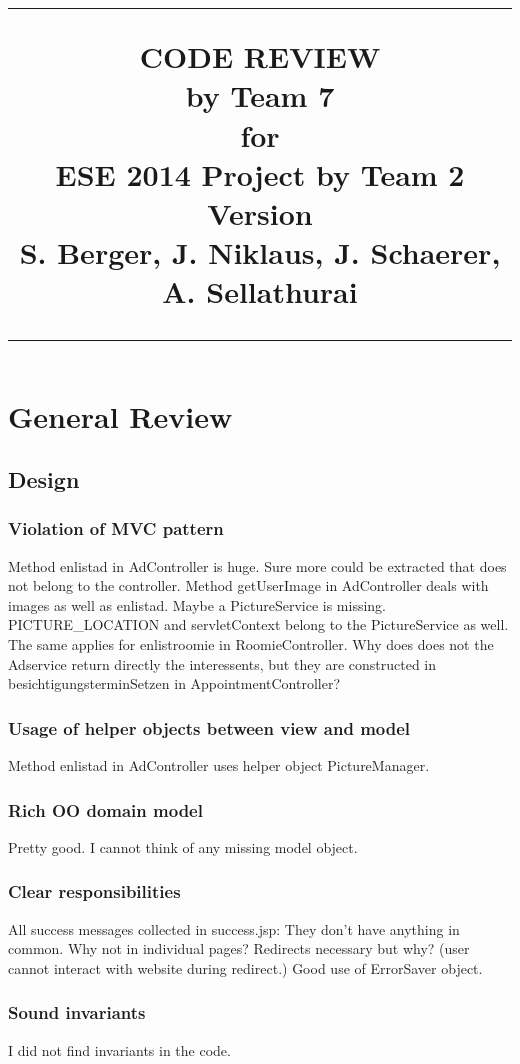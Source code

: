\documentclass{scrreprt}
\title{%
\flushright
\rule{16cm}{5pt}\vskip1cm
\Huge{CODE REVIEW\\ by Team 7}\\
\vspace{2cm}
for\\
\vspace{2cm}
ESE 2014 Project by Team 2\\
\vspace{2cm}
\LARGE{Version \myversion \\}
\vspace{2cm}
S. Berger, J. Niklaus, J. Schaerer, A. Sellathurai \\
\vfill
\rule{16cm}{5pt}
}
\date{}
\begin{document}
\maketitle
\tableofcontents

\chapter{General Review}
\section{Design}
\subsection{Violation of MVC pattern}
Method enlistad in AdController is huge. Sure more could be extracted that does not belong to the controller. Method getUserImage in AdController deals with images as well as enlistad. Maybe a PictureService is missing. PICTURE_LOCATION and servletContext belong to the PictureService as well. The same applies for enlistroomie in RoomieController. Why does does not the Adservice return directly the interessents, but they are constructed in besichtigungsterminSetzen in AppointmentController?

\subsection{Usage of helper objects between view and model}
Method enlistad in AdController uses helper object PictureManager.

\subsection{Rich OO domain model}
Pretty good. I cannot think of any missing model object.

\subsection{Clear responsibilities}
All success messages collected in success.jsp: They don't have anything in common. Why not in individual pages? Redirects necessary but why? (user cannot interact with website during redirect.) Good use of ErrorSaver object.

\subsection{Sound invariants}
I did not find invariants in the code.
\end{document}
